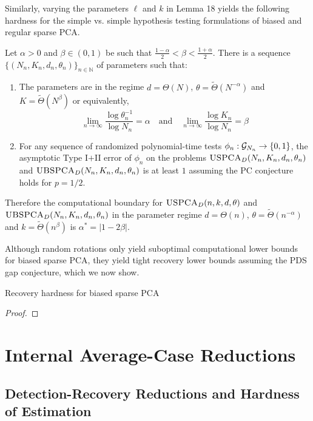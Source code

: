 \documentclass[11pt]{article}
\begin{document}
Similarly, varying the parameters $\ell$ and $k$ in Lemma 18 yields the following hardness for the simple vs. simple hypothesis testing formulations of biased and regular sparse PCA. 

\begin{theorem}
Let $\alpha > 0$ and $\beta \in (0, 1)$ be such that $\frac{1 - \alpha}{2} < \beta < \frac{1 + \alpha}{2}$. There is a sequence $\{ (N_n, K_n, d_n, \theta_n) \}_{n \in \mathbb{N}}$ of parameters such that:
\begin{enumerate}
\item The parameters are in the regime $d = \Theta(N)$, $\theta = \tilde{\Theta}(N^{-\alpha})$ and $K = \tilde{\Theta}(N^\beta)$ or equivalently,
$$\lim_{n \to \infty} \frac{\log \theta_n^{-1}}{\log N_n} = \alpha \quad \text{and} \quad \lim_{n \to \infty} \frac{\log K_n}{\log N_n} = \beta$$
\item For any sequence of randomized polynomial-time tests $\phi_n : \mathcal{G}_{N_n} \to \{0, 1\}$, the asymptotic Type I$+$II error of $\phi_n$ on the problems $\textsc{USPCA}_D(N_n, K_n, d_n, \theta_n)$ and $\textsc{UBSPCA}_D(N_n, K_n, d_n, \theta_n)$ is at least $1$ assuming the PC conjecture holds for $p = 1/2$.
\end{enumerate}
Therefore the computational boundary for $\textsc{USPCA}_D(n, k, d, \theta)$ and $\textsc{UBSPCA}_D(N_n, K_n, d_n, \theta_n)$ in the parameter regime $d = \Theta(n)$, $\theta = \tilde{\Theta}(n^{-\alpha})$ and $k = \tilde{\Theta}(n^\beta)$ is $\alpha^* = |1 - 2\beta |$.
\end{theorem}

Although random rotations only yield suboptimal computational lower bounds for biased sparse PCA, they yield tight recovery lower bounds assuming the PDS gap conjecture, which we now show.

\begin{theorem}
Recovery hardness for biased sparse PCA
\end{theorem}

\begin{proof}

\end{proof}

\section{Internal Average-Case Reductions}

\subsection{Detection-Recovery Reductions and Hardness of Estimation}
\end{document}
